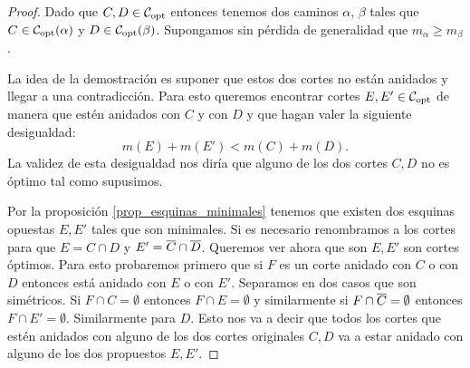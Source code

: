 \documentclass[tesis.tex]{subfiles}
\begin{document}
\begin{proof}
	Dado que $C, D \in {\cal C}_{\text{opt}}$ entonces tenemos dos caminos $\alpha$, $\beta$ tales que $C \in {\cal C}_{\text{opt}}(\alpha)$ y $D \in {\cal C}_{\text{opt}}(\beta)$.
	Supongamos sin pérdida de generalidad que $m_{\alpha} \ge m_{\beta}$.
	
	La idea de la demostración es suponer que estos dos cortes no están anidados y llegar a una contradicción.
	Para esto queremos encontrar cortes $E, E' \in {\cal C}_{\text{opt}}$ de manera que estén anidados con $C$ y con $D$ y que hagan valer la siguiente desigualdad:
	\[
	m(E) + m(E') < m(C) + m(D).
	\]   
	La validez de esta desigualdad nos diría que alguno de los dos cortes $C,D$ no es óptimo tal como supusimos.
	
	Por la proposición \ref{prop_esquinas_minimales} tenemos que existen dos esquinas opuestas $ E, E' $ tales que son minimales.	
	Si es necesario renombramos a los cortes para que $E = C \cap D$ y $E' = \overline C \cap \overline D$.
	Queremos ver ahora que son $E,E'$ son cortes óptimos.	
	Para esto probaremos primero que si $F$ es un corte anidado con $C$ o con $D$ entonces está anidado con $E$ o con $E'$.
	Separamos en dos casos que son simétricos.
	Si $F \cap C = \emptyset$ entonces $F \cap E= \emptyset$ y similarmente si $F \cap \overline C = \emptyset$ entonces $F \cap E' = \emptyset$.
	Similarmente para $D$.
	Esto nos va a decir que todos los cortes que estén anidados con alguno de los dos cortes originales $C,D$ va a estar anidado con alguno de los dos propuestos $E,E'$.
	

\end{proof}
\end{document}
